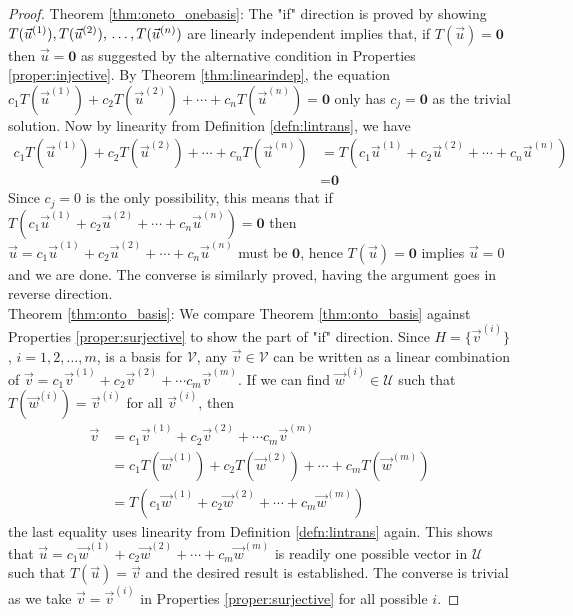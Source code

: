 \begin{proof}
Theorem \ref{thm:oneto_onebasis}: The "if" direction is proved by showing $T(\vec{u}^{(1)}), T(\vec{u}^{(2)}),\\ \ldots, T(\vec{u}^{(n)})$ are linearly independent implies that, if $T(\vec{u}) = \textbf{0}$ then $\vec{u} = \textbf{0}$ as suggested by the alternative condition in Properties \ref{proper:injective}. By Theorem \ref{thm:linearindep}, the equation $c_1T(\vec{u}^{(1)}) + c_2T(\vec{u}^{(2)}) + \cdots + c_nT(\vec{u}^{(n)}) = \textbf{0}$ only has $c_j = \textbf{0}$ as the trivial solution. Now by linearity from Definition \ref{defn:lintrans}, we have
\begin{align*}
c_1T(\vec{u}^{(1)}) + c_2T(\vec{u}^{(2)}) + \cdots + c_nT(\vec{u}^{(n)}) &= T(c_1\vec{u}^{(1)} + c_2\vec{u}^{(2)} + \cdots + c_n\vec{u}^{(n)}) \\
&= \textbf{0}    
\end{align*}
Since $c_j = 0$ is the only possibility, this means that if $T(c_1\vec{u}^{(1)} + c_2\vec{u}^{(2)} + \cdots + c_n\vec{u}^{(n)}) = \textbf{0}$ then $\vec{u} = c_1\vec{u}^{(1)} + c_2\vec{u}^{(2)} + \cdots + c_n\vec{u}^{(n)}$ must be $\textbf{0}$, hence $T(\vec{u}) = \textbf{0}$ implies $\vec{u} = 0$ and we are done. The converse is similarly proved,  having the argument goes in reverse direction. \\
Theorem \ref{thm:onto_basis}: We compare Theorem \ref{thm:onto_basis} against Properties \ref{proper:surjective} to show the part of "if" direction. Since $H = \{\vec{v}^{(i)}\}$, $i = 1,2,\ldots,m$, is a basis for $\mathcal{V}$, any $\vec{v} \in \mathcal{V}$ can be written as a linear combination of $\vec{v} = c_1\vec{v}^{(1)} + c_2\vec{v}^{(2)} + \cdots c_m\vec{v}^{(m)}$. If we can find $\vec{w}^{(i)} \in \mathcal{U}$ such that $T(\vec{w}^{(i)}) = \vec{v}^{(i)}$ for all $\vec{v}^{(i)}$, then
\begin{align*}
\vec{v} &= c_1\vec{v}^{(1)} + c_2\vec{v}^{(2)} + \cdots c_m\vec{v}^{(m)}\\
&= c_1T(\vec{w}^{(1)}) + c_2T(\vec{w}^{(2)}) + \cdots + c_mT(\vec{w}^{(m)}) \\
&= T(c_1\vec{w}^{(1)} + c_2\vec{w}^{(2)} + \cdots + c_m\vec{w}^{(m)})
\end{align*}
the last equality uses linearity from Definition \ref{defn:lintrans} again. This shows that $\vec{u} = c_1\vec{w}^{(1)} + c_2\vec{w}^{(2)} + \cdots + c_m\vec{w}^{(m)}$ is readily one possible vector in $\mathcal{U}$ such that $T(\vec{u}) = \vec{v}$ and the desired result is established. The converse is trivial as we take $\vec{v} = \vec{v}^{(i)}$ in Properties \ref{proper:surjective} for all possible $i$.
\end{proof}

